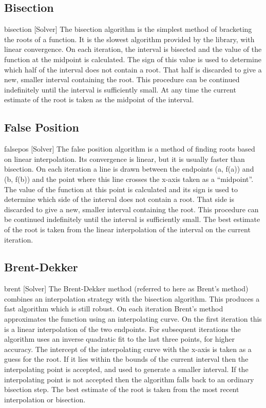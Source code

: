 \subsection{Bisection}
bisection [Solver]
The bisection algorithm is the simplest method of bracketing the roots of a function.
It is the slowest algorithm provided by the library, with linear convergence.
On each iteration, the interval is bisected and the value of the function at the midpoint
is calculated. The sign of this value is used to determine which half of the interval does
not contain a root. That half is discarded to give a new, smaller interval containing
the root. This procedure can be continued indefinitely until the interval is sufficiently
small.
At any time the current estimate of the root is taken as the midpoint of the interval.


\subsection{False Position}
falsepos [Solver]
The false position algorithm is a method of finding roots based on linear interpolation.
Its convergence is linear, but it is usually faster than bisection.
On each iteration a line is drawn between the endpoints (a, f(a)) and (b, f(b)) and
the point where this line crosses the x-axis taken as a “midpoint”. The value of the
function at this point is calculated and its sign is used to determine which side of the
interval does not contain a root. That side is discarded to give a new, smaller interval
containing the root. This procedure can be continued indefinitely until the interval
is sufficiently small.
The best estimate of the root is taken from the linear interpolation of the interval on
the current iteration.








\subsection{Brent-Dekker}
brent [Solver]
The Brent-Dekker method (referred to here as Brent’s method) combines an interpolation
strategy with the bisection algorithm. This produces a fast algorithm which is
still robust.
On each iteration Brent’s method approximates the function using an interpolating
curve. On the first iteration this is a linear interpolation of the two endpoints. For
subsequent iterations the algorithm uses an inverse quadratic fit to the last three
points, for higher accuracy. The intercept of the interpolating curve with the x-axis
is taken as a guess for the root. If it lies within the bounds of the current interval
then the interpolating point is accepted, and used to generate a smaller interval. If
the interpolating point is not accepted then the algorithm falls back to an ordinary
bisection step.
The best estimate of the root is taken from the most recent interpolation or bisection.


